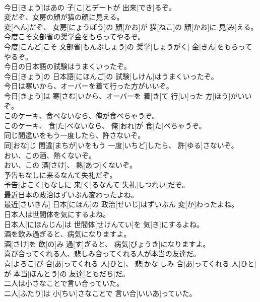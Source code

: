 \documentclass[8pt]{extreport}
\begin{document}
\begin{CJK}{UTF8}{min}
\\	今日[きょう]はあの 子[こ]とデートが 出来[でき]るぞ。
\\	変だぞ、女房の顔が猫の顔に見える。	
\\	変[へん]だぞ、 女房[にょうぼう]の 顔[かお]が 猫[ねこ]の 顔[かお]に 見[み]える。
\\	今度こそ文部省の奨学金をもらってやるぞ。	
\\	今度[こんど]こそ 文部省[もんぶしょう]の 奨学[しょうがく] 金[きん]をもらってやるぞ。
\\	今日の日本語の試験はうまくいったぞ。	
\\	今日[きょう]の 日本語[にほんご]の 試験[しけん]はうまくいったぞ。
\\	今日は寒いから、オーバーを着て行った方がいいぞ。	
\\	今日[きょう]は 寒[さむ]いから、オーバーを 着[き]て 行[い]った 方[ほう]がいいぞ。
\\	このケーキ、食べないなら、俺が食べちゃうぞ。	
\\	このケーキ、 食[た]べないなら、 俺[おれ]が 食[た]べちゃうぞ。
\\	同じ間違いをもう一度したら、許さないぞ。	
\\	同[おな]じ 間違[まちが]いをもう 一度[いちど]したら、 許[ゆる]さないぞ。
\\	おい、この酒、熱くないぞ。	
\\	おい、この 酒[さけ]、 熱[あつ]くないぞ。
\\	予告もなしに来るなんて失礼だぞ。	
\\	予告[よこく]もなしに 来[く]るなんて 失礼[しつれい]だぞ。
\\	最近日本の政治はずいぶん変わったよね。	
\\	最近[さいきん] 日本[にほん]の 政治[せいじ]はずいぶん 変[か]わったよね。
\\	日本人は世間体を気にするよね。	
\\	日本人[にほんじん]は 世間体[せけんてい]を 気[き]にするよね。
\\	酒を飲み過ぎると、病気になりますよ。	
\\	酒[さけ]を 飲[の]み 過[す]ぎると、 病気[びょうき]になりますよ。
\\	喜び合ってくれる人、悲しみ合ってくれる人が本当の友達だ。	
\\	喜[よろこ]び 合[あ]ってくれる 人[ひと]、 悲[かな]しみ 合[あ]ってくれる 人[ひと]が 本当[ほんとう]の 友達[ともだち]だ。
\\	二人は小さなことで言い合っていた。	
\\	二人[ふたり]は 小[ちい]さなことで 言い合[いいあ]っていた。

\end{CJK}
\end{document}
